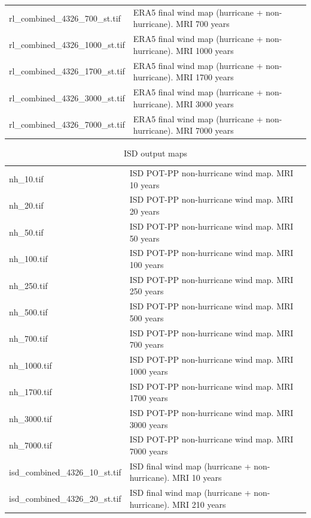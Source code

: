 \documentclass[12pt,oneside]{reedthesis}
\begin{document}
\begin{longtable}[t]{>{\raggedright\arraybackslash}p{2in}>{\raggedright\arraybackslash}p{3.6in}}
rl\_combined\_4326\_700\_st.tif & ERA5 final wind map (hurricane + non-hurricane). MRI 700 years\\
rl\_combined\_4326\_1000\_st.tif & ERA5 final wind map (hurricane + non-hurricane). MRI 1000 years\\
rl\_combined\_4326\_1700\_st.tif & ERA5 final wind map (hurricane + non-hurricane). MRI 1700 years\\
rl\_combined\_4326\_3000\_st.tif & ERA5 final wind map (hurricane + non-hurricane). MRI 3000 years\\
rl\_combined\_4326\_7000\_st.tif & ERA5 final wind map (hurricane + non-hurricane). MRI 7000 years\\
\bottomrule
\end{longtable}
\endgroup{}

\begingroup\fontsize{8}{10}\selectfont
\begin{longtable}[t]{>{\raggedright\arraybackslash}p{2in}>{\raggedright\arraybackslash}p{3.5in}}
\caption[ISD output maps]{\label{tab:isdmaps}ISD output maps}\\
\toprule
\multicolumn{1}{l}{File} & \multicolumn{1}{l}{Description}\\
\midrule
nh\_10.tif & ISD POT-PP non-hurricane wind map. MRI 10 years\\
nh\_20.tif & ISD POT-PP non-hurricane wind map. MRI 20 years\\
nh\_50.tif & ISD POT-PP non-hurricane wind map. MRI 50 years\\
nh\_100.tif & ISD POT-PP non-hurricane wind map. MRI 100 years\\
nh\_250.tif & ISD POT-PP non-hurricane wind map. MRI 250 years\\
nh\_500.tif & ISD POT-PP non-hurricane wind map. MRI 500 years\\
nh\_700.tif & ISD POT-PP non-hurricane wind map. MRI 700 years\\
nh\_1000.tif & ISD POT-PP non-hurricane wind map. MRI 1000 years\\
nh\_1700.tif & ISD POT-PP non-hurricane wind map. MRI 1700 years\\
nh\_3000.tif & ISD POT-PP non-hurricane wind map. MRI 3000 years\\
nh\_7000.tif & ISD POT-PP non-hurricane wind map. MRI 7000 years\\
isd\_combined\_4326\_10\_st.tif & ISD final wind map (hurricane + non-hurricane). MRI 10 years\\
isd\_combined\_4326\_20\_st.tif & ISD final wind map (hurricane + non-hurricane). MRI 210 years\\

\end{longtable}
\end{document}
